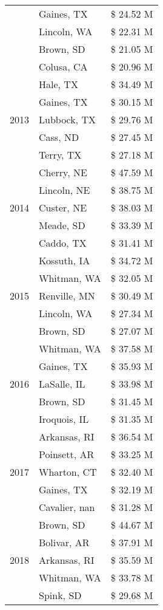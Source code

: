 \begin{longtable}{llr}
 & Gaines, TX & \$ 24.52 M \\
 & Lincoln, WA & \$ 22.31 M \\
 & Brown, SD & \$ 21.05 M \\
 & Colusa, CA & \$ 20.96 M \\
\cline{1-3}
\multirow[t]{5}{*}{2013} & Hale, TX & \$ 34.49 M \\
 & Gaines, TX & \$ 30.15 M \\
 & Lubbock, TX & \$ 29.76 M \\
 & Cass, ND & \$ 27.45 M \\
 & Terry, TX & \$ 27.18 M \\
\cline{1-3}
\multirow[t]{5}{*}{2014} & Cherry, NE & \$ 47.59 M \\
 & Lincoln, NE & \$ 38.75 M \\
 & Custer, NE & \$ 38.03 M \\
 & Meade, SD & \$ 33.39 M \\
 & Caddo, TX & \$ 31.41 M \\
\cline{1-3}
\multirow[t]{5}{*}{2015} & Kossuth, IA & \$ 34.72 M \\
 & Whitman, WA & \$ 32.05 M \\
 & Renville, MN & \$ 30.49 M \\
 & Lincoln, WA & \$ 27.34 M \\
 & Brown, SD & \$ 27.07 M \\
\cline{1-3}
\multirow[t]{5}{*}{2016} & Whitman, WA & \$ 37.58 M \\
 & Gaines, TX & \$ 35.93 M \\
 & LaSalle, IL & \$ 33.98 M \\
 & Brown, SD & \$ 31.45 M \\
 & Iroquois, IL & \$ 31.35 M \\
\cline{1-3}
\multirow[t]{5}{*}{2017} & Arkansas, RI & \$ 36.54 M \\
 & Poinsett, AR & \$ 33.25 M \\
 & Wharton, CT & \$ 32.40 M \\
 & Gaines, TX & \$ 32.19 M \\
 & Cavalier, nan & \$ 31.28 M \\
\cline{1-3}
\multirow[t]{5}{*}{2018} & Brown, SD & \$ 44.67 M \\
 & Bolivar, AR & \$ 37.91 M \\
 & Arkansas, RI & \$ 35.59 M \\
 & Whitman, WA & \$ 33.78 M \\
 & Spink, SD & \$ 29.68 M \\

\end{longtable}
